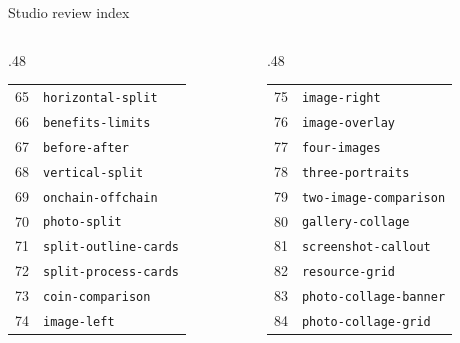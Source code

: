 \documentclass[aspectratio=169]{beamer}
\begin{document}
\begin{frame}{Studio review index}\fontsize{6.5}{9}\selectfont\begin{columns}[T]
\begin{column}{.48\textwidth}\begin{tabular}{rl}
65 & \texttt{horizontal-split} \\
66 & \texttt{benefits-limits} \\
67 & \texttt{before-after} \\
68 & \texttt{vertical-split} \\
69 & \texttt{onchain-offchain} \\
70 & \texttt{photo-split} \\
71 & \texttt{split-outline-cards} \\
72 & \texttt{split-process-cards} \\
73 & \texttt{coin-comparison} \\
74 & \texttt{image-left} \\
\end{tabular}\end{column}
\begin{column}{.48\textwidth}\begin{tabular}{rl}
75 & \texttt{image-right} \\
76 & \texttt{image-overlay} \\
77 & \texttt{four-images} \\
78 & \texttt{three-portraits} \\
79 & \texttt{two-image-comparison} \\
80 & \texttt{gallery-collage} \\
81 & \texttt{screenshot-callout} \\
82 & \texttt{resource-grid} \\
83 & \texttt{photo-collage-banner} \\
84 & \texttt{photo-collage-grid} \\
\end{tabular}\end{column}
\end{columns}\end{frame}
\end{document}
